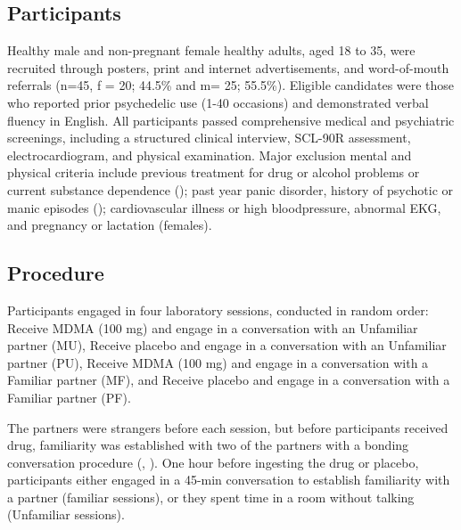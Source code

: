 \documentclass[
  man,
  longtable,
  nolmodern,
  notxfonts,
  notimes,
  colorlinks=true,linkcolor=blue,citecolor=blue,urlcolor=blue]{apa7}
\begin{document}
\subsection{Participants}\label{participants}

Healthy male and non-pregnant female healthy adults, aged 18 to 35, were
recruited through posters, print and internet advertisements, and
word-of-mouth referrals (n=45, f = 20; 44.5\% and m= 25; 55.5\%).
Eligible candidates were those who reported prior psychedelic use (1-40
occasions) and demonstrated verbal fluency in English. All participants
passed comprehensive medical and psychiatric screenings, including a
structured clinical interview, SCL-90R assessment, electrocardiogram,
and physical examination. Major exclusion mental and physical criteria
include previous treatment for drug or alcohol problems or current
substance dependence
(); past year panic disorder, history of
psychotic or manic episodes
(); cardiovascular illness or high
bloodpressure, abnormal EKG, and pregnancy or lactation (females).

\subsection{Procedure}\label{procedure}

Participants engaged in four laboratory sessions, conducted in random
order: Receive MDMA (100 mg) and engage in a conversation with an
Unfamiliar partner (MU), Receive placebo and engage in a conversation
with an Unfamiliar partner (PU), Receive MDMA (100 mg) and engage in a
conversation with a Familiar partner (MF), and Receive placebo and
engage in a conversation with a Familiar partner (PF).

The partners were strangers before each session, but before participants
received drug, familiarity was established with two of the partners with
a bonding conversation procedure
(,
). One hour before
ingesting the drug or placebo, participants either engaged in a 45-min
conversation to establish familiarity with a partner (familiar
sessions), or they spent time in a room without talking (Unfamiliar
sessions).
\end{document}
